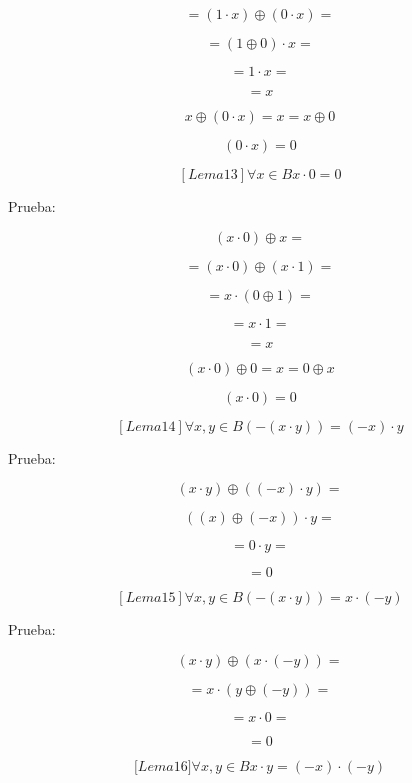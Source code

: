 \documentclass[
]{article}
\begin{document}
\begin{enumerate}
\begin{enumerate}
\begin{enumerate}
      \[{= \left( {1 \cdot x} \right)} \oplus {\left( {0 \cdot x} \right) =}\]

      \[{= {\left( {1 \oplus 0} \right) \cdot x}} =\]

      \[{= {1 \cdot x}} =\]

      \[= x\]

      \[x \oplus {{\left( {0 \cdot x} \right) = x} = x} \oplus 0\]

      \[\left( {0 \cdot x} \right) = 0\]

      \[\left\lbrack {{Lema}13} \right\rbrack\forall{x \in B}{{x \cdot 0} = 0}\]

      Prueba:

      \[\left( {x \cdot 0} \right) \oplus {x =}\]

      \[{= \left( {x \cdot 0} \right)} \oplus {\left( {x \cdot 1} \right) =}\]

      \[{= {x \cdot \left( {0 \oplus 1} \right)}} =\]

      \[{= {x \cdot 1}} =\]

      \[= x\]

      \[\left( {x \cdot 0} \right) \oplus {{0 = x} = 0} \oplus x\]

      \[\left( {x \cdot 0} \right) = 0\]

      \[\left\lbrack {{Lema}14} \right\rbrack\forall x,{y \in B}{\left( {- \left( {x \cdot y} \right)} \right) = {\left( {- x} \right) \cdot y}}\]

      Prueba:

      \[\left( {x \cdot y} \right) \oplus {\left( {\left( {- x} \right) \cdot y} \right) =}\]

      \[{\left( {(x) \oplus \left( {- x} \right)} \right) \cdot y} =\]

      \[{= {0 \cdot y}} =\]

      \[= 0\]

      \[\left\lbrack {{Lema}15} \right\rbrack\forall x,{y \in B}{\left( {- \left( {x \cdot y} \right)} \right) = {x \cdot \left( {- y} \right)}}\]

      Prueba:

      \[\left( {x \cdot y} \right) \oplus {\left( {x \cdot \left( {- y} \right)} \right) =}\]

      \[{= {x \cdot \left( {y \oplus \left( {- y} \right)} \right)}} =\]

      \[{= {x \cdot 0}} =\]

      \[= 0\]

      \[{\lbrack{{Lema}16}\rbrack}\forall x,{y \in B}{{x \cdot y} = {\left( {- x} \right) \cdot \left( {- y} \right)}}\]


\end{enumerate}
\end{enumerate}
\end{enumerate}
\end{document}
